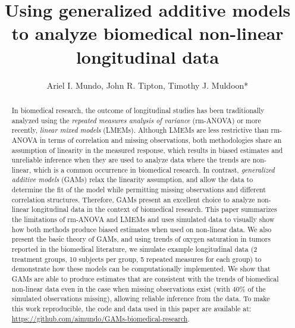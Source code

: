 \documentclass[Royal,times,sagev]{sagej}
\begin{document}
\title{Using generalized additive models to analyze biomedical
non-linear longitudinal data}


\author{Ariel I. Mundo, John R. Tipton, Timothy
J. Muldoon*}




\begin{abstract}
In biomedical research, the outcome of longitudinal studies has been
traditionally analyzed using the \emph{repeated measures analysis of
variance} (rm-ANOVA) or more recently, \emph{linear mixed models}
(LMEMs). Although LMEMs are less restrictive than rm-ANOVA in terms of
correlation and missing observations, both methodologies share an
assumption of linearity in the measured response, which results in
biased estimates and unreliable inference when they are used to analyze
data where the trends are non-linear, which is a common occurrence in
biomedical research. In contrast, \emph{generalized additive models}
(GAMs) relax the linearity assumption, and allow the data to determine
the fit of the model while permitting missing observations and different
correlation structures. Therefore, GAMs present an excellent choice to
analyze non-linear longitudinal data in the context of biomedical
research. This paper summarizes the limitations of rm-ANOVA and LMEMs
and uses simulated data to visually show how both methods produce biased
estimates when used on non-linear data. We also present the basic theory
of GAMs, and using trends of oxygen saturation in tumors reported in the
biomedical literature, we simulate example longitudinal data (2
treatment groups, 10 subjects per group, 5 repeated measures for each
group) to demonstrate how these models can be computationally
implemented. We show that GAMs are able to produce estimates that are
consistent with the trends of biomedical non-linear data even in the
case when missing observations exist (with 40\% of the simulated
observations missing), allowing reliable inference from the data. To
make this work reproducible, the code and data used in this paper are
available at: \url{https://github.com/aimundo/GAMs-biomedical-research}.
\end{abstract}
\end{document}
